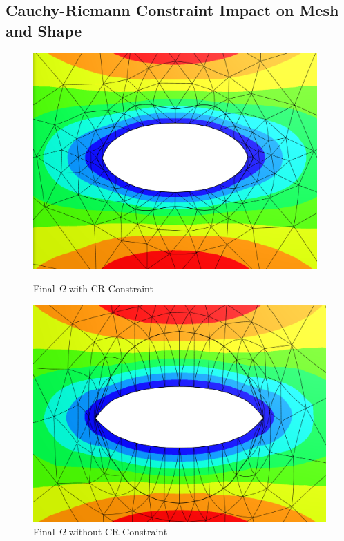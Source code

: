 \pagebreak

\subsection{Cauchy-Riemann Constraint Impact on Mesh and Shape}

\begin{figure}[h]
    \begin{minipage}{.5\textwidth}
        \centering
        \includegraphics[width=0.97\textwidth]{figures/mesh_good.PNG}
        \caption{Final $\Omega$ with CR Constraint}
        \label{plot_ref_good_mesh_u}
    \end{minipage}
    \begin{minipage}{.5\textwidth}
        \centering
        \includegraphics[width=1\textwidth]{figures/mesh_bad.PNG}
        \caption{Final $\Omega$ without CR Constraint}
        \label{plot_ref_bad_mesh_u}
    \end{minipage}
\end{figure}
